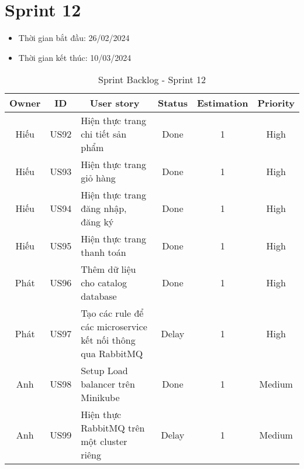 \section{Sprint 12}
\begin{itemize}
    \item Thời gian bắt đầu: 26/02/2024
    \item Thời gian kết thúc: 10/03/2024
\end{itemize}
\begin{table}[H]
    \begin{tabular}{|c|c|m{6cm}|c|c|c|}
    \hline
    \textbf{Owner} & \textbf{ID} & \multicolumn{1}{c|}{\textbf{User story}}                                & \textbf{Status} & \textbf{Estimation} & \textbf{Priority} \\ \hline
    Hiếu         & US92        & Hiện thực trang chi tiết sản phẩm                    & Done            & 1                   & High         \\ \hline
    Hiếu        & US93        & Hiện thực trang giỏ hàng                     & Done            & 1                   & High         \\ \hline
    Hiếu         & US94        & Hiện thực trang đăng nhập, đăng ký                   & Done            & 1                   & High         \\ \hline
    Hiếu        & US95        & Hiện thực trang thanh toán                    & Done            & 1                   & High         \\ \hline
    Phát        & US96        & Thêm dữ liệu cho catalog database                     & Done            & 1                   & High         \\ \hline
    Phát        & US97        & Tạo các rule để các microservice kết nối thông qua RabbitMQ                     & Delay            & 1                   & High         \\ \hline
    Anh        & US98        & Setup Load balancer trên Minikube                    & Done            & 1                   & Medium         \\ \hline
    Anh        & US99        & Hiện thực RabbitMQ trên một cluster riêng                     & Delay            & 1                   & Medium         \\ \hline
    \end{tabular}
    \caption{Sprint Backlog - Sprint 12}
    \label{tab:sprint-12}
\end{table}